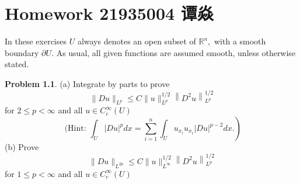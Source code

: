 \documentclass[a4paper]{book}
\makeatletter
\newcommand{\voidenvironment}[1]{%
  \expandafter\providecommand\csname env@#1@save@env\endcsname{}%
  \expandafter\providecommand\csname env@#1@process\endcsname{}%
  \@ifundefined{#1}{}{\RenewEnviron{#1}{}}%
}
\numberwithin{equation}{chapter}
\theoremstyle{definition}
\newtheorem{problem}[exm]{Problem}
\newlength{\length}
\makeatother
\begin{document}
\pagestyle{empty}
% 



\setcounter{chapter}{14}




\chapter{Homework 21935004 谭焱}


In these exercises $U$ always denotes an open subset of $\mathbb{R}^{n},$ with a smooth boundary $\partial U$. As usual, all given functions are assumed smooth, unless otherwise stated.
\begin{problem}(a) Integrate by parts to prove
  \[
    \|D u\|_{L^{p}} \leq C\|u\|_{L^{p}}^{1 / 2}\left\|D^{2} u\right\|_{L^{p}}^{1 / 2}
  \]
  for $2 \leq p<\infty$ and all $u \in C_{c}^{\infty}(U)$
  \[
    \text { (Hint: }\left.\int_{U}|D u|^{p} d x=\sum_{i=1}^{n} \int_{U} u_{x_{i}} u_{x_{i}}|D u|^{p-2} d x .\right)
  \]
  (b) Prove
  \[
    \|D u\|_{L^{2 p}} \leq C\|u\|_{L^{\infty}}^{1 / 2}\left\|D^{2} u\right\|_{L^{p}}^{1 / 2}
  \]
  for $1 \leq p<\infty$ and all $u \in C_{c}^{\infty}(U)$
\end{problem}
\end{document}
